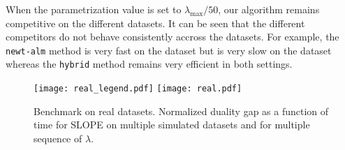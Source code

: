 When the parametrization value is set to $\lambda_{\text{max}}/50$, our algorithm remains competitive on the different datasets.
It can be seen that the different competitors do not behave consistently accross the datasets.
For example, the \texttt{newt-alm} method is very fast on the  dataset but is very slow on the  dataset whereas the \texttt{hybrid} method remains very efficient in both settings.

\begin{figure*}[!t]
  \centering
  \texttt{[image: real\_legend.pdf]}
  \texttt{[image: real.pdf]}
  \caption{Benchmark on real datasets. Normalized duality gap as a function of time for SLOPE on multiple simulated datasets and for multiple sequence of $\lambda$.}
  \label{fig:real-data}
\end{figure*}
